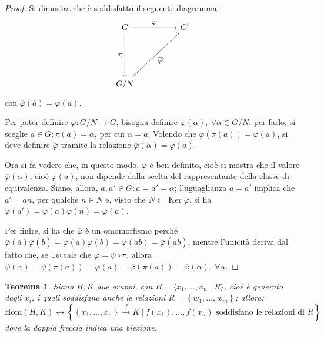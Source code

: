 \documentclass[11pt]{article}
\theoremstyle{style}
\newtheorem{teorema}{Teorema}[section]
\numberwithin{equation}{subsection}
\begin{document}
\begin{proof}
	Si dimostra che \`e soddisfatto il seguente diagramma:
	\[
	\begin{tikzcd}
		G & & G '\\
		\\
		\\
		 G / N
		\arrow[from=1-1, to=1-3, "\displaystyle \varphi "]
		\arrow[from=1-1, to=4-1, "\displaystyle \pi"']
		\arrow[from=4-1, to=1-3, "\displaystyle \overline{\varphi}"']
	\end{tikzcd}
	\] 
	con $\overline{\varphi }(\overline{a}) = \varphi (a)$.

	Per poter definire $\overline{\varphi } : G / N \to G$, bisogna definire $\overline{\varphi }(\alpha ), \ \forall \alpha \in G / N$; per farlo, si sceglie $a \in G : \pi (a) = \alpha $, per cui $\alpha  = \overline{a}$. 
	Volendo che $\overline{\varphi }(\pi(a)) = \varphi (a)$, si deve definire $\overline{\varphi }$ tramite la relazione $\overline{\varphi }(\alpha ) = \varphi (a)$.

	Ora si fa vedere che, in questo modo, $\overline{\varphi }$ \`e ben definito, cio\`e si mostra che il valore $\overline{\varphi }(\alpha )$, cio\`e $\varphi (a)$, non dipende dalla scelta del rappresentante della classe di equivalenza.
	Siano, allora, $a,a' \in G : \overline{a}= \overline{a}' = \alpha $; l'uguaglianza $\overline{a}=\overline{a}'$ implica che $a' = an$, per qualche $n \in N$ e, visto che $N\subset\operatorname{Ker} \varphi $, si ha $\varphi (a')=\varphi (a)\varphi (n)=\varphi (a)$.

	Per finire, si ha che $\overline{\varphi }$ \`e un omomorfismo perch\'e $\overline{\varphi }(\overline{a})\overline{\varphi }(\overline{b}) = \varphi (a)\varphi (b) = \varphi (ab) = \overline{\varphi }(\overline{ab})$, mentre l'unicit\`a deriva dal fatto che, se $\exists \overline{\psi }$ tale che $\varphi = \overline{\psi }\circ\pi$, allora $\overline{\psi }(\alpha ) = \overline{\psi }(\pi(a)) = \varphi (a) = \overline{\varphi }(\pi(a))=\overline{\varphi }(\alpha ), \ \forall \alpha $.
\end{proof}
\begin{teorema}\label{mitoat}
	Siano $H, K$ due gruppi, con $H = \langle x_1,\ldots,x_n  \mid R \rangle$, cio\`e \`e generato dagli $x_i$, i quali soddisfano anche le relazioni $R=\left\{ w_1,\ldots,w_m \right\} $; allora:
	\[
		\mathrm{Hom} (H,K) \longleftrightarrow
			\left\{ \left\{ x_1,\ldots,x_n \right\} \stackrel{f}{\longrightarrow} K \ \Big\lvert\ f(x_1),\ldots,f(x_n)\text{ soddisfano le relazioni di } R \right\} 
	\] 
	dove la doppia freccia indica una biezione.
\end{teorema}
\end{document}
